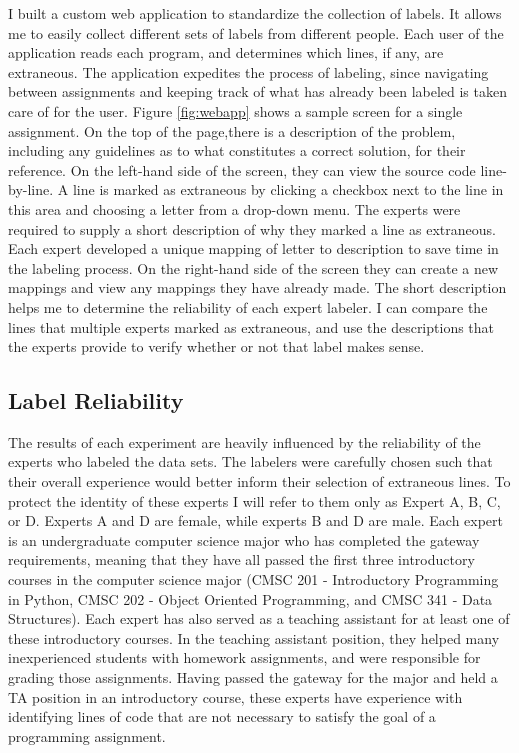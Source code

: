 I built a custom web application to standardize the collection of labels. It allows me to easily collect different sets of labels from different people. Each user of the application reads each program, and determines which lines, if any, are extraneous. The application expedites the process of labeling, since navigating between assignments and keeping track of what has already been labeled is taken care of for the user. Figure \ref{fig:webapp} shows a sample screen for a single assignment. On the top of the page,there is a description of the problem, including any guidelines as to what constitutes a correct solution, for their reference. On the left-hand side of the screen, they can view the source code line-by-line. A line is marked as extraneous by clicking a checkbox next to the line in this area and choosing a letter from a drop-down menu. The experts were required to supply a short description of why they marked a line as extraneous. Each expert developed a unique mapping of letter to description to save time in the labeling process. On the right-hand side of the screen they can create a new mappings and view any mappings they have already made. The short description helps me to determine the reliability of each expert labeler. I can compare the lines that multiple experts marked as extraneous, and use the descriptions that the experts provide to verify whether or not that label makes sense.


\subsection{Label Reliability}

The results of each experiment are heavily influenced by the reliability of the experts who labeled the data sets. The labelers were carefully chosen such that their overall experience would better inform their selection of extraneous lines. To protect the identity of these experts I will refer to them only as Expert A, B, C, or D. Experts A and D are female, while experts B and D are male. Each expert is an undergraduate computer science major who has completed the gateway requirements, meaning that they have all passed the first three introductory courses in the computer science major (CMSC 201 - Introductory Programming in Python, CMSC 202 - Object Oriented Programming, and CMSC 341 - Data Structures). Each expert has also served as a teaching assistant for at least one of these introductory courses. In the teaching assistant position, they helped many inexperienced students with homework assignments, and were responsible for grading those assignments. Having passed the gateway for the major and held a TA position in an introductory course, these experts have experience with identifying lines of code that are not necessary to satisfy the goal of a programming assignment.

